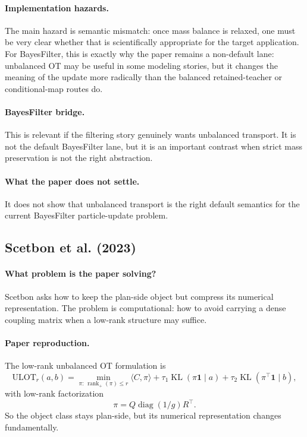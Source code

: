 \documentclass[11pt]{report}
\newcommand{\KL}{\operatorname{KL}}
\newcommand{\diag}{\operatorname{diag}}
\begin{document}
\paragraph{Implementation hazards.}
The main hazard is semantic mismatch: once mass balance is relaxed, one must be very
clear whether that is scientifically appropriate for the target application.  For
BayesFilter, this is exactly why the paper remains a non-default lane: unbalanced OT
may be useful in some modeling stories, but it changes the meaning of the update more
radically than the balanced retained-teacher or conditional-map routes do.

\paragraph{BayesFilter bridge.}
This is relevant if the filtering story genuinely wants unbalanced transport.  It is
not the default BayesFilter lane, but it is an important contrast when strict mass
preservation is not the right abstraction.

\paragraph{What the paper does not settle.}
It does not show that unbalanced transport is the right default semantics for the
current BayesFilter particle-update problem.

\subsection*{Scetbon et al. (2023)}

\paragraph{What problem is the paper solving?}
Scetbon asks how to keep the plan-side object but compress its numerical
representation.  The problem is computational: how to avoid carrying a dense
coupling matrix when a low-rank structure may suffice.

\paragraph{Paper reproduction.}
The low-rank unbalanced OT formulation is
\begin{equation}
\mathrm{ULOT}_r(a,b)
=
\min_{\pi:\,\operatorname{rank}_+(\pi)\le r}
\langle C,\pi\rangle
+\tau_1\KL(\pi\mathbf 1\mid a)
+\tau_2\KL(\pi^{\top}\mathbf 1\mid b),
\label{eq:scetbon-ulot}
\end{equation}
with low-rank factorization
\begin{equation}
\pi = Q\diag(1/g)R^{\top}.
\label{eq:scetbon-low-rank-factor}
\end{equation}
So the object class stays plan-side, but its numerical representation changes
fundamentally.
\end{document}
